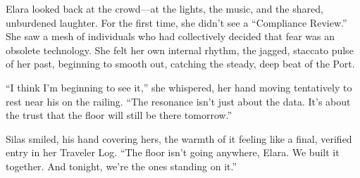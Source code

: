 Elara looked back at the crowd—at the lights, the music, and the shared, unburdened laughter. For the first time, she didn't see a ``Compliance Review.'' She saw a mesh of individuals who had collectively decided that fear was an obsolete technology. She felt her own internal rhythm, the jagged, staccato pulse of her past, beginning to smooth out, catching the steady, deep beat of the Port. 

``I think I'm beginning to see it,'' she whispered, her hand moving tentatively to rest near his on the railing. ``The resonance isn't just about the data. It's about the trust that the floor will still be there tomorrow.''

Silas smiled, his hand covering hers, the warmth of it feeling like a final, verified entry in her Traveler Log. ``The floor isn't going anywhere, Elara. We built it together. And tonight, we're the ones standing on it.''
